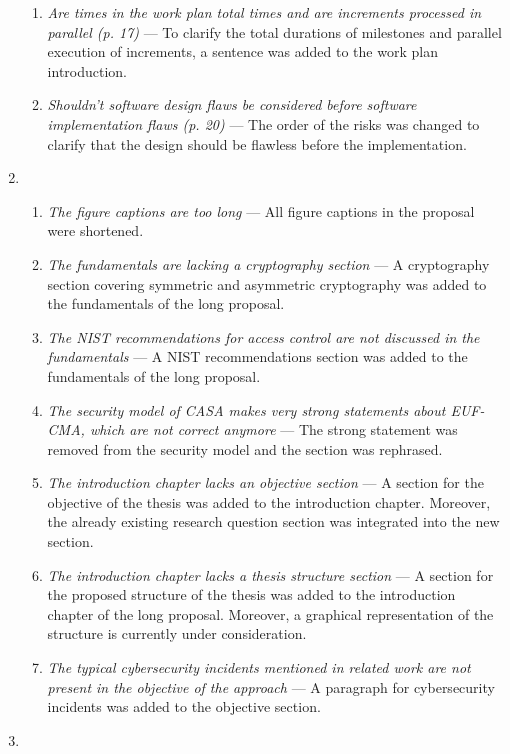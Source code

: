 \begin{enumerate}[label=R\arabic*.]
\begin{enumerate}[label=Q\arabic*.]
        \item \textit{Are times in the work plan total times and are increments processed in parallel (p. 17)} --- To clarify the total durations of milestones and parallel execution of increments, a sentence was added to the work plan introduction.
        \item \textit{Shouldn't software design flaws be considered before software implementation flaws (p. 20)} --- The order of the risks was changed to clarify that the design should be flawless before the implementation.
    \end{enumerate}
    \item \begin{enumerate}[label=Q\arabic*.]
        \item \textit{The figure captions are too long} --- All figure captions in the proposal were shortened.
        \item \textit{The fundamentals are lacking a cryptography section} --- A cryptography section covering symmetric and asymmetric cryptography was added to the fundamentals of the long proposal.
        \item \textit{The NIST recommendations for access control are not discussed in the fundamentals} --- A NIST recommendations section was added to the fundamentals of the long proposal.
        \item \textit{The security model of CASA makes very strong statements about EUF-CMA, which are not correct anymore} --- The strong statement was removed from the security model and the section was rephrased.
        \item \textit{The introduction chapter lacks an objective section} --- A section for the objective of the thesis was added to the introduction chapter. Moreover, the already existing research question section was integrated into the new section.
        \item \textit{The introduction chapter lacks a thesis structure section} --- A section for the proposed structure of the thesis was added to the introduction chapter of the long proposal. Moreover, a graphical representation of the structure is currently under consideration.
        \item \textit{The typical cybersecurity incidents mentioned in related work are not present in the objective of the approach} --- A paragraph for cybersecurity incidents was added to the objective section.
    \end{enumerate}
    \item \begin{enumerate}[label=Q\arabic*.]

\end{enumerate}
\end{enumerate}
